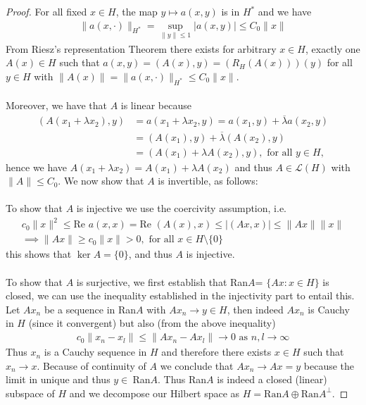 \documentclass[11pt,a4paper]{article}
\theoremstyle{definition}
\begin{document}
\begin{proof}
For all fixed $x \in H$, the map $y \mapsto a(x,y)$ is in $H^*$ and we have 
\begin{align*}
\| a(x, \cdot) \|_{H^*} = \sup_{ \|y \| \leq 1 } | a(x,y)| \leq C_0 \|x\|
\end{align*}
From Riesz's representation Theorem there exists for arbitrary $x \in H$, exactly one $A(x) \in H$ such that $a(x,y)=(A(x),y)=(R_H(A(x)))(y)$ for all $y \in H$ with $\|A(x)\| = \| a(x, \cdot) \|_{H^*} \leq C_0 \|x\|$. 
\\\\
Moreover, we have that $A$ is linear because 
\begin{align*}
(A(x_1 + \lambda x_2), y)&= a(x_1 + \lambda x_2, y) = a(x_1,y) + \overline{\lambda}a (x_2,y)\\
& = (A(x_1), y) + \overline{\lambda}(A(x_2),y) \\
& = (A(x_1) + \lambda A(x_2),y), \text{ for all } y \in H,
\end{align*}
hence we have $A(x_1 + \lambda x_2)= A(x_1) + \lambda A(x_2)$ and thus $A \in \mathcal{L}(H)$ with $\| A \| \leq C_0$. We now show that $A$ is invertible, as follows: \\
\\
To show that $A$ is injective we use the coercivity assumption, i.e. 
\begin{align*}
c_0 \| x \|^2 \leq \text{Re } a(x,x) = \text{Re } (A(x),x) \leq | (Ax,x)| \leq \| Ax\| \| x \| \\
\implies \|Ax\| \geq c_0 \|x\| >0, \text{ for all } x \in H \setminus \lbrace 0 \rbrace
\end{align*}
this shows that $\ker A = \lbrace 0 \rbrace$, and thus $A$ is injective. 
\\\\
To show that $A$ is surjective, we first establish that Ran$A$= $\lbrace Ax: x \in H \rbrace$ is closed, we can use the inequality established in the injectivity part to entail this. Let $Ax_n$ be a sequence in Ran$A$ with $Ax_n \to y \in H$, then indeed $Ax_n$ is Cauchy in $H$ (since it convergent) but also (from the above inequality)
\begin{align*}
c_0 \| x_n - x_l \| \leq \| Ax_n - Ax_l \| \to 0 \text{ as } n,l \to \infty 
\end{align*}
Thus $x_n$ is a Cauchy sequence in $H$ and therefore there exists $x \in H$ such that $x_n \to x$. Because of continuity of $A$ we conclude that $Ax_n \to Ax=y$ because the limit in unique and thus $y \in \ $Ran$A$. Thus Ran$A$ is indeed a closed (linear) subspace of $H$ and we decompose our Hilbert space as $H= \text{Ran}A \oplus \text{Ran}A^\perp$. 

\end{proof}
\end{document}
